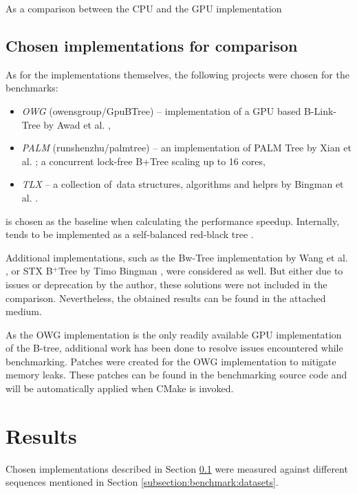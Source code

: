 As a comparison between the CPU and the GPU implementation

\subsection{Chosen implementations for comparison}\label{subsection:benchmark:implementations}

As for the implementations themselves, the following projects were chosen for the benchmarks:

\begin{itemize}
  \item \textit{OWG} (owensgroup/GpuBTree) -- implementation of a GPU based B-Link-Tree by Awad et al. \cite{awad},
  \item \textit{PALM} (runshenzhu/palmtree) -- an implementation of PALM Tree \cite{palm} by Xian et al. \cite{palm-impl}; a concurrent lock-free B+Tree scaling up to 16 cores,
  \item \textit{TLX} -- a collection of \CC\,data structures, algorithms and helprs by Bingman et al. \cite{TLX}.
\end{itemize}

 is chosen as the baseline when calculating the performance speedup. Internally,  tends to be implemented as a self-balanced red-black tree \cite{cppreference-map}.

Additional implementations, such as the Bw-Tree \cite{bw-tree} implementation by Wang et al. \cite{bwtree-impl}, or STX B$^+$Tree by Timo Bingman \cite{stx-b+tree}, were considered as well. But either due to issues or deprecation by the author, these solutions were not included in the comparison. Nevertheless, the obtained results can be found in the attached medium.

As the OWG implementation is the only readily available GPU implementation of the B-tree, additional work has been done to resolve issues encountered while benchmarking. Patches were created for the OWG implementation to mitigate memory leaks. These patches can be found in the benchmarking source code and will be automatically applied when CMake is invoked.

\section{Results}\label{section:results}

Chosen implementations described in Section \ref{subsection:benchmark:implementations} were measured against different sequences mentioned in Section \ref{subsection:benchmark:datasets}.

